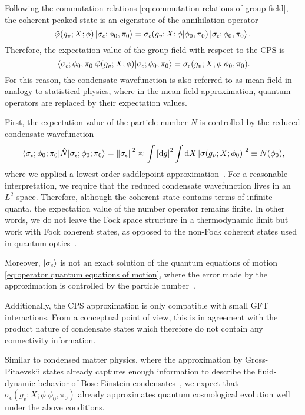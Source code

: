 \documentclass[11pt,a4paper]{article}
\begin{document}
Following the commutation relations \eqref{eq:commutation relations of group field}, the coherent peaked state is an eigenstate of the annihilation operator
%
\begin{equation}
\hat{\varphi}(g_v;X;\phi)\ket{\sigma_{\epsilon};\phi_0,\pi_0}
=
\sigma_{\epsilon}(g_v;X;\phi\vert\phi_0,\pi_0)\ket{\sigma_{\epsilon};\phi_0,\pi_0}.
\end{equation}
%
Therefore, the expectation value of the group field with respect to the CPS is
%
\begin{equation}
\expval{\hat{\varphi}(g_v;X;\phi)}{\sigma_{\epsilon};\phi_0,\pi_0}
=
\sigma_{\epsilon}(g_v;X;\phi\vert\phi_0,\pi_0).
\end{equation}
%
For this reason, the condensate wavefunction is also referred to as mean-field in analogy to statistical physics, where in the mean-field approximation, quantum operators are replaced by their expectation values.

First, the expectation value of the particle number $N$ is controlled by the reduced condensate wavefunction
%
\begin{equation}\label{eq:expectation value of number operator}
\expval{\hat{N}}{\sigma_{\epsilon};\phi_0;\pi_0}
=
\norm{\sigma_{\epsilon}}^2
\approx
\int\left[\dd{g}\right]^2\int\dd{X}\abs{\sigma(g_v;X;\phi_0)}^2
\equiv N(\phi_0),
\end{equation}
%
where we applied a lowest-order saddlepoint approximation~\cite{Marchetti:2020umh}.
%
For a reasonable interpretation, we require that the reduced condensate wavefunction lives in an $L^2$-space. Therefore, although the coherent state contains terms of infinite quanta, the expectation value of the number operator remains finite. In other words, we do not leave the Fock space structure in a thermodynamic limit but work with Fock coherent states, as opposed to the non-Fock coherent states used in quantum optics~\cite{Honegger1990}.

Moreover, $\ket{\sigma_{\epsilon}}$ is not an exact solution of the quantum equations of motion \eqref{eq:operator quantum equations of motion}, where the error made by the approximation is controlled by the particle number~\cite{Oriti:2016qtz}.

Additionally, the CPS approximation is only compatible with small GFT interactions. From a conceptual point of view, this is in agreement with the product nature of condensate states which therefore do not contain any connectivity information.

Similar to condensed matter physics, where the approximation by Gross-Pitaevskii states already captures enough information to describe the fluid-dynamic behavior of Bose-Einstein condensates~\cite{pitaevskii2016bose}, we expect that $\sigma_{\epsilon}(g_v;X;\phi\vert\phi_0,\pi_0)$ already approximates quantum cosmological evolution well under the above conditions. 
\end{document}
